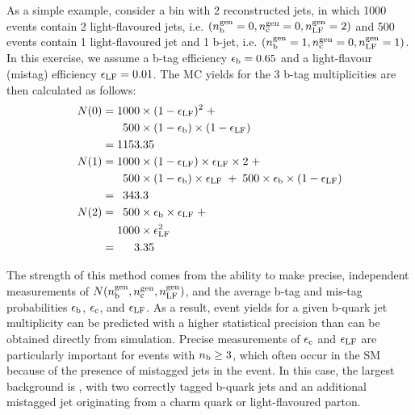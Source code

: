 As a simple example, consider a bin with 2 reconstructed jets, in
which 1000 events contain 2 light-flavoured jets, i.e. $(n_{\rm
  b}^{\rm gen} = 0,n_{\rm c}^{\rm gen} = 0,n_{\rm LF}^{\rm gen} = 2)$
and 500 events contain 1 light-flavoured jet and 1 b-jet,
i.e. $(n_{\rm b}^{\rm gen} = 1,n_{\rm c}^{\rm gen} = 0,n_{\rm LF}^{\rm
  gen} = 1)$.  In this exercise, we assume a b-tag efficiency
$\epsilon_{\rm b} = 0.65$ and a light-flavour (mistag) efficiency
$\epsilon_{\rm LF} = 0.01$.  The MC yields for the 3 b-tag
multiplicities are then calculated as follows:
\begin{align*}
N(0) = & \; 1000\times (1-\epsilon_{\rm LF})^2 \;+                                \\
       & \; \phantom{1}500\times(1-\epsilon_{\rm b})\times(1-\epsilon_{\rm LF})   \\
     = & \; 1153.35                                                               \\
N(1) = & \; 1000\times (1-\epsilon_{\rm LF})\times \epsilon_{\rm LF} \times 2 \;+ \\
       & \; \phantom{1}500\times (1-\epsilon_{\rm b})\times\epsilon_{\rm LF} \;+\;  
       500\times \epsilon_{\rm b} \times (1-\epsilon_{\rm LF})                    \\
     = & \; \phantom{1}343.3                                                      \\
N(2) = & \; \phantom{1}500\times \epsilon_{\rm b} \times \epsilon_{\rm LF} \;+    \\
       & \; 1000\times \epsilon_{\rm LF}^2                                        \\
     = & \; \phantom{100}3.35
\end{align*}

The strength of this method comes from the 
ability to make precise, \nb independent measurements 
of $N(n_{\rm b}^{\rm gen},n_{\rm c}^{\rm gen},n_{\rm LF}^{\rm gen})$,
and the average b-tag and mis-tag probabilities
$\epsilon_{\rm b}$, $\epsilon_{\rm c}$, and $\epsilon_{\rm LF}$.
As a result, event yields for a given b-quark jet multiplicity can
be predicted with a higher statistical precision than can be obtained
directly from simulation.
Precise measurements of $\epsilon_{\rm c}$ and
$\epsilon_{\rm LF}$ are particularly important for events with $n_{\rm b} \geq
3$, which often occur in the SM because of the presence of mistagged
jets in the event. In this case, the largest background is \ttbar,
with two correctly tagged b-quark jets and an additional mistagged jet
originating from a charm quark or light-flavoured parton.

